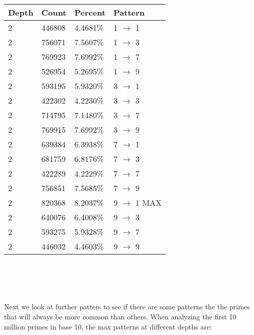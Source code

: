 \documentclass[13pt]{article}
\begin{document}
\begin{tabular} { l l l l }
Depth & Count      & Percent   & Pattern\\
\hline
    2 &     446808 &   4.4681\% & 1 $\rightarrow$ 1\\
    2 &     756071 &   7.5607\% & 1 $\rightarrow$ 3\\
    2 &     769923 &   7.6992\% & 1 $\rightarrow$ 7\\
    2 &     526954 &   5.2695\% & 1 $\rightarrow$ 9\\
    2 &     593195 &   5.9320\% & 3 $\rightarrow$ 1\\
    2 &     422302 &   4.2230\% & 3 $\rightarrow$ 3\\
    2 &     714795 &   7.1480\% & 3 $\rightarrow$ 7\\
    2 &     769915 &   7.6992\% & 3 $\rightarrow$ 9\\
    2 &     639384 &   6.3938\% & 7 $\rightarrow$ 1\\
    2 &     681759 &   6.8176\% & 7 $\rightarrow$ 3\\
    2 &     422289 &   4.2229\% & 7 $\rightarrow$ 7\\
    2 &     756851 &   7.5685\% & 7 $\rightarrow$ 9\\
    2 &     820368 &   8.2037\% & 9 $\rightarrow$ 1 MAX \\  
    2 &     640076 &   6.4008\% & 9 $\rightarrow$ 3\\
    2 &     593275 &   5.9328\% & 9 $\rightarrow$ 7\\
    2 &     446032 &   4.4603\% & 9 $\rightarrow$ 9\\
\end{tabular}\\\\
\\\\\indent
Next we look at further patters to see if there are some patterns the the primes that will always be more common than others.
When analyzing the first 10 million primes in base 10, the max patterns at different depths are:\\\\
\end{document}
